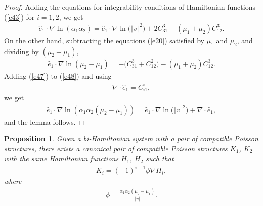 \documentclass[pdftex]{sigma}
\numberwithin{equation}{section}
\newtheorem{Proposition}[Theorem]{Proposition}
 { \theoremstyle{definition}
\newtheorem{Definition}[Theorem]{Definition} }
\begin{document}
\begin{proof}
Adding the equations for integrability conditions of Hamiltonian functions (\ref{e43}) for $i=1,2$, we get
\begin{gather}
\widehat{e}_{1}\cdot \nabla \ln ( \alpha _{1}\alpha _{2}) =\widehat{e}_{1}\cdot \nabla \ln \big( \Vert v\Vert^{2}\big)+2C_{31}^{3}+(\mu _{1}+\mu _{2}) C_{12}^{3}.\label{e47}
\end{gather}
On the other hand, subtracting the equations (\ref{e20}) satisf\/ied by $\mu _{1}$ and $\mu _{2}$, and dividing by $( \mu_{2}-\mu_{1}) $,
\begin{gather}
\widehat{e}_{1}\cdot \nabla \ln (\mu _{2}-\mu _{1}) =-\big(C_{31}^{3}+C_{12}^{2}\big) -(\mu _{1}+\mu _{2}) C_{12}^{3} . \label{e48}
\end{gather}
Adding (\ref{e47}) to (\ref{e48}) and using
\begin{gather*}
\nabla \cdot \widehat{e}_{1}=C_{i1}^{i},
\end{gather*}
we get
\begin{gather*}
\widehat{e}_{1}\cdot \nabla \ln ( \alpha _{1}\alpha _{2} (\mu_{2}-\mu _{1}) ) =\widehat{e}_{1}\cdot \nabla \ln
\big(\Vert v\Vert ^{2}\big) +\nabla \cdot \widehat{e}_{1},
\end{gather*}
and the lemma follows.
\end{proof}

\begin{Proposition}\label{proposition4} Given a bi-Hamiltonian system with a pair of compatible Poisson structures, there exists a canonical pair of compatible Poisson structures $K_{1}$, $K_{2}$ with the same Hamiltonian functions $H_{1}$, $H_{2}$ such that
\begin{gather*}
K_{i}=(-1)^{i+1}\phi \nabla H_{i},
\end{gather*}
where
\begin{gather*}
\phi =\frac{\alpha _{1}\alpha _{2}(\mu _{2}-\mu _{1}) }{\Vert v\Vert }.
\end{gather*}
\end{Proposition}
\end{document}
